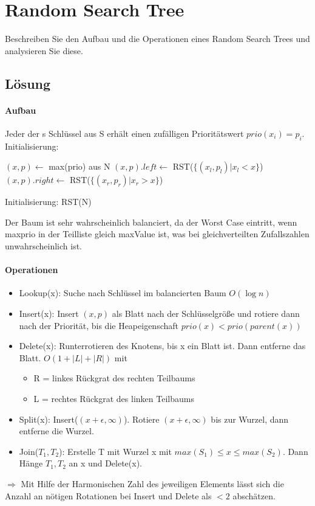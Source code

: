 \section{Random Search Tree}
Beschreiben Sie den Aufbau und die Operationen eines Random Search Trees und analysieren Sie diese.

\subsection*{Lösung}
\paragraph{Aufbau} Jeder der s Schlüssel aus S erhält einen zufälligen Prioritätswert $ prio(x_i) = p_i $. Initialisierung:

\begin{algorithm}
\SetAlgoLined
$(x, p) \gets $ max(prio) aus N\;
$(x, p).left \gets$ RST($ \{(x_l, p_l) |x_l < x \}$)\;
$(x, p).right \gets$ RST($ \{(x_r, p_r) |x_r > x \}$)\;
\caption{Initialisierung: RST(N)}
\end{algorithm}
Der Baum ist sehr wahrscheinlich balanciert, da der Worst Case eintritt, wenn maxprio in der Teilliste gleich maxValue ist, was bei gleichverteilten Zufallszahlen unwahrscheinlich ist.

\paragraph{Operationen}
\begin{itemize}
    \item[] Lookup(x): Suche nach Schlüssel im balancierten Baum $ O(\log n) $
    \item[] Insert(x): Insert $ (x,p) $ als Blatt nach der Schlüsselgröße und rotiere dann nach der Priorität, bis die Heapeigenschaft $prio(x) < prio(parent(x))$
    \item[] Delete(x): Runterrotieren des Knotens, bis x ein Blatt ist. Dann entferne das Blatt. $ O(1 + |L| + |R|) $ mit
    \begin{itemize}
        \item[]  R = linkes Rückgrat des rechten Teilbaums
        \item[]  L = rechtes Rückgrat des linken Teilbaums
    \end{itemize}
    \item[] Split(x): Insert($(x+ \epsilon, \infty)$). Rotiere $(x+ \epsilon, \infty)$ bis zur Wurzel, dann entferne die Wurzel.
    \item[] Join($T_1, T_2$): Erstelle T mit Wurzel x mit $ max(S_1) \leq x \leq max(S_2) $. Dann Hänge $ T_1, T_2 $ an x und Delete(x).
\end{itemize}

$ \Rightarrow $ Mit Hilfe der Harmonischen Zahl des jeweiligen Elements lässt sich die Anzahl an nötigen Rotationen bei Insert und Delete als $ <2 $ abschätzen.
